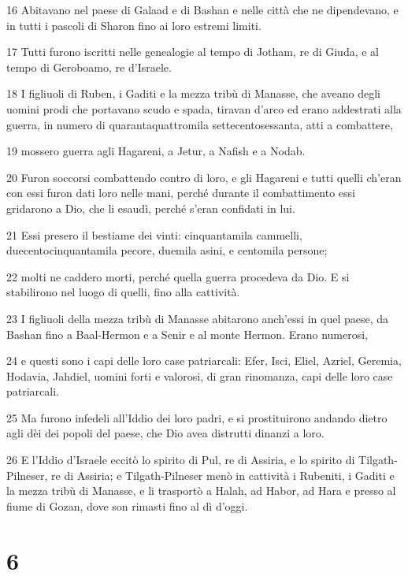 \par 16 Abitavano nel paese di Galaad e di Bashan e nelle città che ne dipendevano, e in tutti i pascoli di Sharon fino ai loro estremi limiti.
\par 17 Tutti furono iscritti nelle genealogie al tempo di Jotham, re di Giuda, e al tempo di Geroboamo, re d'Israele.
\par 18 I figliuoli di Ruben, i Gaditi e la mezza tribù di Manasse, che aveano degli uomini prodi che portavano scudo e spada, tiravan d'arco ed erano addestrati alla guerra, in numero di quarantaquattromila settecentosessanta, atti a combattere,
\par 19 mossero guerra agli Hagareni, a Jetur, a Nafish e a Nodab.
\par 20 Furon soccorsi combattendo contro di loro, e gli Hagareni e tutti quelli ch'eran con essi furon dati loro nelle mani, perché durante il combattimento essi gridarono a Dio, che li esaudì, perché s'eran confidati in lui.
\par 21 Essi presero il bestiame dei vinti: cinquantamila cammelli, duecentocinquantamila pecore, duemila asini, e centomila persone;
\par 22 molti ne caddero morti, perché quella guerra procedeva da Dio. E si stabilirono nel luogo di quelli, fino alla cattività.
\par 23 I figliuoli della mezza tribù di Manasse abitarono anch'essi in quel paese, da Bashan fino a Baal-Hermon e a Senir e al monte Hermon. Erano numerosi,
\par 24 e questi sono i capi delle loro case patriarcali: Efer, Isci, Eliel, Azriel, Geremia, Hodavia, Jahdiel, uomini forti e valorosi, di gran rinomanza, capi delle loro case patriarcali.
\par 25 Ma furono infedeli all'Iddio dei loro padri, e si prostituirono andando dietro agli dèi dei popoli del paese, che Dio avea distrutti dinanzi a loro.
\par 26 E l'Iddio d'Israele eccitò lo spirito di Pul, re di Assiria, e lo spirito di Tilgath-Pilneser, re di Assiria; e Tilgath-Pilneser menò in cattività i Rubeniti, i Gaditi e la mezza tribù di Manasse, e li trasportò a Halah, ad Habor, ad Hara e presso al fiume di Gozan, dove son rimasti fino al dì d'oggi.

\chapter{6}

